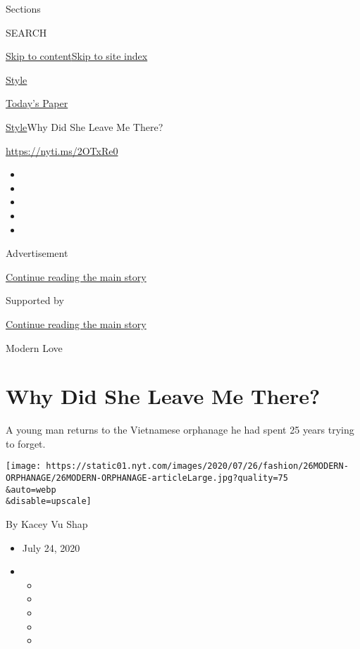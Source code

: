 Sections

SEARCH

\protect\hyperlink{site-content}{Skip to
content}\protect\hyperlink{site-index}{Skip to site index}

\href{https://www.nytimes.com/section/style}{Style}

\href{https://myaccount.nytimes.com/auth/login?response_type=cookie\&client_id=vi}{}

\href{https://www.nytimes.com/section/todayspaper}{Today's Paper}

\href{/section/style}{Style}\textbar{}Why Did She Leave Me There?

\url{https://nyti.ms/2OTxRe0}

\begin{itemize}
\item
\item
\item
\item
\item
\end{itemize}

Advertisement

\protect\hyperlink{after-top}{Continue reading the main story}

Supported by

\protect\hyperlink{after-sponsor}{Continue reading the main story}

Modern Love

\hypertarget{why-did-she-leave-me-there}{%
\section{Why Did She Leave Me There?}\label{why-did-she-leave-me-there}}

A young man returns to the Vietnamese orphanage he had spent 25 years
trying to forget.

\texttt{[image: https://static01.nyt.com/images/2020/07/26/fashion/26MODERN-ORPHANAGE/26MODERN-ORPHANAGE-articleLarge.jpg?quality=75\\\&auto=webp\\\&disable=upscale]}

By Kacey Vu Shap

\begin{itemize}
\item
  July 24, 2020
\item
  \begin{itemize}
  \item
  \item
  \item
  \item
  \item
  \end{itemize}
\end{itemize}

